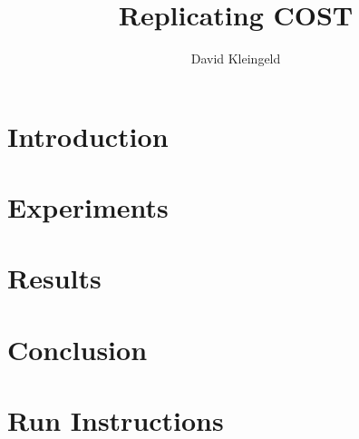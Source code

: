 \documentclass[lang=en, hanging-titles=true]{skrapport}
\title{Replicating COST}
\author[dskleingeld@gmail.com]{David Kleingeld}
\begin{document}
\maketitle
\tableofcontents

\newpage
\section{Introduction} \label{into}

\section{Experiments} \label{exp}

\section{Results} \label{res}

\clearpage
\section{Conclusion} \label{concl}


\clearpage
\appendix
\section{Run Instructions} \label{howToRun}

\printbibliography
\end{document}

